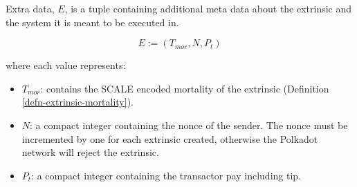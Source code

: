 \begin{definition}
    \label{defn-extra-data}
    Extra data, $E$, is a tuple containing additional meta data about the
    extrinsic and the system it is meant to be executed in.

    \[
        E := (T_{mor}, N, P_t)
    \]

    where each value represents:
    \begin{itemize}
        \item $T_{mor}$: contains the SCALE encoded mortality of the extrinsic (Definition
        \ref{defn-extrinsic-mortality}).
        \item $N$: a compact integer containing the nonce of the sender. The
        nonce must be incremented by one for each extrinsic created, otherwise
        the Polkadot network will reject the extrinsic.
        \item $P_t$: a compact integer containing the transactor pay including tip.
    \end{itemize}

\end{definition}

